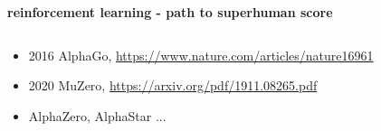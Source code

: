 \documentclass{beamer}
\begin{document}
\begin{frame}{\bf reinforcement learning - path to superhuman score}

  \begin{columns}

    \begin{column}{0.5\textwidth}
    \end{column}

    \begin{column}{0.5\textwidth}
    \end{column}

  \end{columns}

  \begin{itemize} 
    \item 2016 AlphaGo, \url{https://www.nature.com/articles/nature16961}
    \item 2020 MuZero, \url{https://arxiv.org/pdf/1911.08265.pdf}
    \item AlphaZero, AlphaStar ...
  \end{itemize}
\end{frame}
\end{document}
